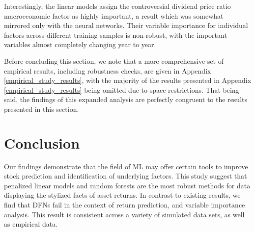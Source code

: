 \documentclass{article}
\begin{document}
Interestingly, the linear models assign the controversial dividend price ratio macroeconomic factor as highly important, a result which was somewhat mirrored only with the neural networks. Their variable importance for individual factors across different training samples is non-robust, with the important variables almost completely changing year to year. 


Before concluding this section, we note that a more comprehensive set of empirical results, including robustness checks, are given in Appendix \ref{empirical_study_results}, with the majority of the results presented in Appendix \ref{empirical_study_results} being omitted due to space restrictions. That being said, the findings of this expanded analysis are perfectly congruent to the results presented in this section. 

\section{Conclusion}

Our findings demonstrate that the field of ML may offer certain tools to improve stock prediction and identification of underlying factors. This study suggest that penalized linear models and random forests are the most robust methods for data displaying the stylized facts of asset returns. In contrast to existing results, we find that DFNs fail in the context of return prediction, and variable importance analysis. This result is consistent across a variety of simulated data sets, as well as empirical data. 

\end{document}

